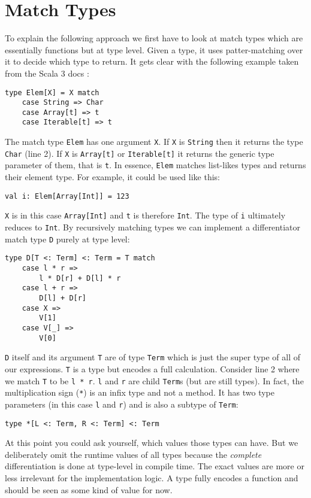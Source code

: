 \section{Match Types} \label{sec:matchTypes}
To explain the following approach we first have to look at match types which are essentially functions but at type level. Given a type, it uses patter-matching over it to decide which type to return. It gets clear with the following example taken from the Scala 3 docs \cite{matchTypesScala3}:
\begin{lstlisting}
type Elem[X] = X match
    case String => Char
    case Array[t] => t
    case Iterable[t] => t
\end{lstlisting}
The match type \lstinline{Elem} has one argument \lstinline{X}. If \lstinline{X} is \lstinline{String} then it returns the type \lstinline{Char} (line 2). If \lstinline{X} is \lstinline{Array[t]} or \lstinline{Iterable[t]} it returns the generic type parameter of them, that is \lstinline{t}. In essence, \lstinline{Elem} matches list-likes types and returns their element type. For example, it could be used like this:
\begin{lstlisting}
val i: Elem[Array[Int]] = 123
\end{lstlisting}
\lstinline{X} is in this case \lstinline{Array[Int]} and \lstinline{t} is therefore \lstinline{Int}. The type of \lstinline{i} ultimately reduces to \lstinline{Int}. By recursively matching types we can implement a differentiator match type \lstinline{D} purely at type level:
\begin{lstlisting}
type D[T <: Term] <: Term = T match
    case l * r => 
        l * D[r] + D[l] * r
    case l + r => 
        D[l] + D[r]
    case X => 
        V[1]
    case V[_] => 
        V[0]
\end{lstlisting}
\lstinline{D} itself and its argument \lstinline{T} are of type \lstinline{Term} which is just the super type of all of our expressions.
\lstinline{T} is a type but encodes a full calculation. Consider line 2 where we match \lstinline{T} to be \lstinline{l * r}. \lstinline{l} and \lstinline{r} are child \lstinline{Term}s (but are still types). In fact, the multiplication sign (\lstinline{*}) is  an infix type and not a method. It has two type parameters (in this case \lstinline{l} and \lstinline{r}) and is also a subtype of \lstinline{Term}:
\begin{lstlisting}
type *[L <: Term, R <: Term] <: Term
\end{lstlisting}
At this point you could ask yourself, which values those types can have. But we deliberately omit the runtime values of all types because the \emph{complete} differentiation is done at type-level in compile time. The exact values are more or less irrelevant for the implementation logic. A type fully encodes a function and should be seen as some kind of value for now.

